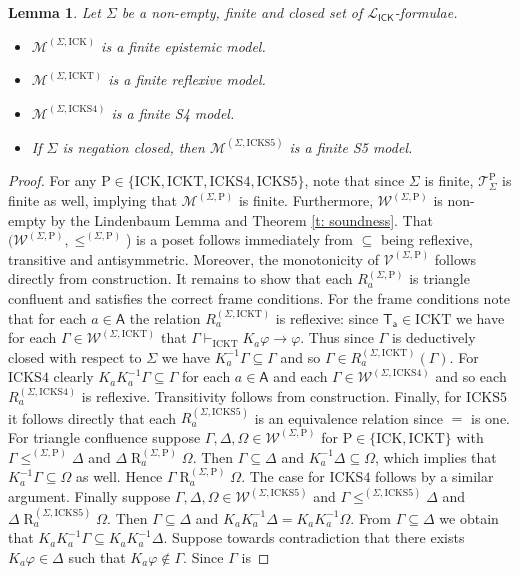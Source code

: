 \documentclass{myifcolog}
\newcommand{\K}{K}
\newcommand\A{\mathsf{A}}
\newcommand{\agi}{a}
\newcommand{\ICK}{\mathsf{ICK}}
\newcommand{\LICK}{\mathcal{L}_{\ICK}}
\newcommand{\fw}{\mathcal{M}}
\newcommand{\Rel}{\mathrel{R}}
\newcommand{\W}{\mathcal{W}}
\newcommand{\V}{\mathcal{V}}
\newcommand{\hick}{\mathrm{ICK}}
\newcommand{\hickt}{\mathrm{ICKT}}
\newcommand{\hicks}{\mathrm{ICKS4}}
\newcommand{\hickss}{\mathrm{ICKS5}}
\newcommand{\hickp}{\mathrm{P}}
\newtheorem{lemma}[theorem]{Lemma}
\numberwithin{theorem}{section}
\begin{document}
\begin{lemma}\label{l: canonical model}
    Let $\Sigma$ be a non-empty, finite and closed set of $\LICK$-formulae.
    \begin{itemize}
        \item $\fw^{(\Sigma, \hick)}$ is a finite epistemic model.
        \item  $\fw^{(\Sigma, \hickt)}$ is a finite reflexive model.
        \item  $\fw^{(\Sigma, \hicks)}$ is a finite S4 model.
        \item  If $\Sigma$ is negation closed, then $\fw^{(\Sigma, \hickss)}$ is a finite S5 model.
    \end{itemize}
\end{lemma}
\begin{proof}
    For any $\hickp \in \{\hick, \hickt, \hicks, \hickss\}$, note that since $\Sigma$ is finite, $\mathcal{T}_\Sigma^\hickp$ is finite as well, implying that $\fw^{(\Sigma, \hickp)}$ is finite. Furthermore, $\W^{(\Sigma, \hickp)}$ is non-empty by the Lindenbaum Lemma and Theorem \ref{t: soundness}. That $(\W^{(\Sigma, \hickp)}, \leq^{(\Sigma, \hickp)}$) is a poset follows immediately from $\subseteq$ being reflexive, transitive and antisymmetric. Moreover, the monotonicity of $\V^{(\Sigma, \hickp)}$ follows directly from construction. It remains to show that each $R_\agi^{(\Sigma, \hickp)}$ is triangle confluent and satisfies the correct frame conditions. For the frame conditions note that for each $\agi \in \A$ the relation $R_\agi^{(\Sigma, \hickt)}$ is reflexive: since $\mathsf{T_\agi} \in \hickt$ we have for each $\Gamma \in \W^{(\Sigma, \hickt)}$ that $\Gamma \vdash_{\hickt} \K_\agi \varphi \rightarrow \varphi$. Thus since $\Gamma$ is deductively closed with respect to $\Sigma$ we have $\K_\agi^{-1} \Gamma \subseteq \Gamma$ and so $\Gamma \in R_\agi^{(\Sigma, \hickt)}(\Gamma)$. For $\hicks$ clearly $\K_\agi \K_\agi^{-1} \Gamma \subseteq \Gamma$ for each $\agi \in \A$ and each $\Gamma \in \W^{(\Sigma, \hicks)}$ and so each $R_\agi^{(\Sigma, \hicks)}$ is reflexive. Transitivity follows from construction. Finally, for $\hickss$ it follows directly that each $R_\agi^{(\Sigma, \hickss)}$ is an equivalence relation since $=$ is one. For triangle confluence suppose $\Gamma, \Delta, \Omega \in \W^{(\Sigma, \hickp)}$ for $\hickp \in \{\hick, \hickt\}$ with $\Gamma \leq^{(\Sigma, \hickp)} \Delta$ and $\Delta \Rel_\agi^{(\Sigma, \hickp)} \Omega$. Then $\Gamma \subseteq \Delta$ and $\K_\agi^{-1} \Delta \subseteq \Omega$, which implies that $\K_\agi^{-1} \Gamma \subseteq \Omega$ as well. Hence $\Gamma \Rel_\agi^{(\Sigma, \hickp)} \Omega$. The case for $\hicks$ follows by a similar argument. Finally suppose $\Gamma, \Delta, \Omega \in \W^{(\Sigma, \hickss)}$ and $\Gamma \leq^{(\Sigma, \hickss)} \Delta$ and $\Delta \Rel_\agi^{(\Sigma, \hickss)} \Omega$. Then $\Gamma \subseteq \Delta$ and $\K_\agi \K_\agi^{-1} \Delta = \K_\agi \K_\agi^{-1} \Omega$. From $\Gamma \subseteq \Delta$ we obtain that $\K_\agi \K_\agi^{-1} \Gamma \subseteq \K_\agi \K_\agi^{-1} \Delta$. Suppose towards contradiction that there exists $\K_\agi \varphi \in \Delta$ such that $\K_\agi \varphi \not \in \Gamma$. Since $\Gamma$ is 
\end{proof}
\end{document}
